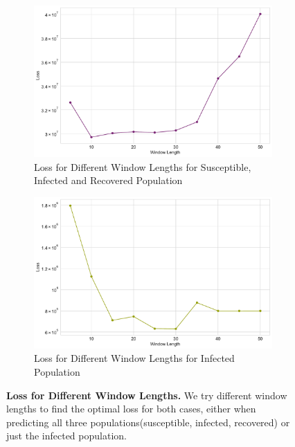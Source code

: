 \documentclass[tikz,fleqn,12pt]{wlscirep}
\begin{document}
\begin{figure}[htbp!]
  \begin{subfigure}[t]{0.48\textwidth}
    \centering
    \includegraphics[width=\linewidth]{images/window_length_loss_SIR_IND.pdf}
    \caption{Loss for Different Window Lengths for Susceptible, Infected and Recovered Population}
    \label{fig:window_length_loss_SIR_IND}
  \end{subfigure}
  \hfill
  \begin{subfigure}[t]{0.48\textwidth}
    \centering
    \includegraphics[width=\linewidth]{images/window_length_loss_I_IND.pdf}
    \caption{Loss for Different Window Lengths for Infected Population}
    \label{fig:window_length_loss_I_IND}
  \end{subfigure}
  \caption{\textbf{Loss for Different Window Lengths.} We try different window lengths to find the optimal loss for both cases, either when predicting all three populations(susceptible, infected, recovered) or just the infected population.}
  \label{fig:window_length_loss_IND}
\end{figure}
\end{document}
